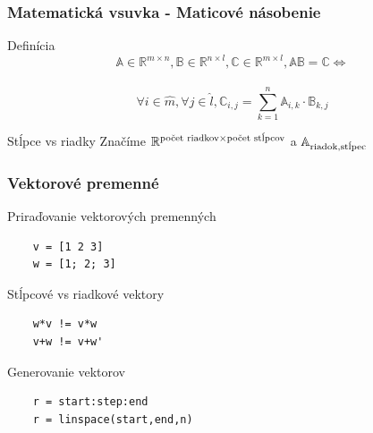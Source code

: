 \documentclass{beamer}
\begin{document}
\begin{frame}[fragile]
\frametitle{Matematická vsuvka - Maticové násobenie}
  \begin{block}{Definícia}
    $$\mathbb{A} \in \mathbb{R}^{m\times n}, \mathbb{B} \in \mathbb{R}^{n\times l}, \mathbb{C} \in \mathbb{R}^{m\times l}, \mathbb{A} \mathbb{B} = \mathbb{C} \iff$$ \\
    $$\forall i \in \hat{m}, \forall j \in \hat{l}, \mathbb{C}_{i,j} = \sum_{k = 1}^n \mathbb{A}_{i,k} \cdot \mathbb{B}_{k,j}$$
  \end{block}
  
  \begin{alertblock}{Stĺpce vs riadky}
   Značíme $\mathbb{R}^{\textnormal{počet riadkov} \times \textnormal{počet stĺpcov}}$
   a $\mathbb{A}_{\textnormal{riadok}, \textnormal{stĺpec}}$
  \end{alertblock}
  
\end{frame}

\begin{frame}[fragile]
\frametitle{Vektorové premenné}
  \begin{block}{Priraďovanie vektorových premenných}
  \begin{verbatim}
    v = [1 2 3]
    w = [1; 2; 3]  \end{verbatim}
  \end{block}
  
  \pause
  
  \begin{alertblock}{Stĺpcové vs riadkové vektory}
  \begin{verbatim}
    w*v != v*w
    v+w != v+w' \end{verbatim}
  \end{alertblock}
  
  \pause

  \begin{block}{Generovanie vektorov}
  \begin{verbatim}
    r = start:step:end
    r = linspace(start,end,n)  \end{verbatim}
  \end{block}
\end{frame}
\end{document}
